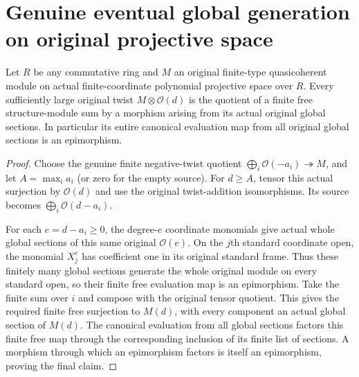 \section{Genuine eventual global generation on original projective space}

\begin{theorem}
\label{thm:coherent-projective-serre-global-generation}
\leanok
Let $R$ be any commutative ring and $M$ an original finite-type
quasicoherent module on actual finite-coordinate polynomial projective
space over $R$. Every sufficiently large original twist
$M\otimes\mathcal O(d)$ is the quotient of a finite free structure-module
sum by a morphism arising from its actual original global sections.
In particular its entire canonical evaluation map from all original
global sections is an epimorphism.
\end{theorem}
\begin{proof}
Choose the genuine finite negative-twist quotient
$\bigoplus_i\mathcal O(-a_i)\twoheadrightarrow M$, and let $A=\max_i a_i$
(or zero for the empty source). For $d\ge A$, tensor this actual
surjection by $\mathcal O(d)$ and use the original twist-addition
isomorphisms. Its source becomes $\bigoplus_i\mathcal O(d-a_i)$.

For each $e=d-a_i\ge0$, the degree-$e$ coordinate monomials give actual
whole global sections of this same original $\mathcal O(e)$. On the
$j$th standard coordinate open, the monomial $X_j^e$ has coefficient
one in its original standard frame. Thus these finitely many global
sections generate the whole original module on every standard open,
so their finite free evaluation map is an epimorphism. Take the finite
sum over $i$ and compose with the original tensor quotient. This gives
the required finite free surjection to $M(d)$, with every component an
actual global section of $M(d)$. The canonical evaluation from all
global sections factors this finite free map through the corresponding
inclusion of its finite list of sections. A morphism through which an
epimorphism factors is itself an epimorphism, proving the final claim.
\end{proof}
